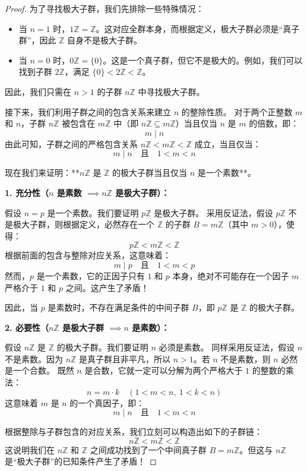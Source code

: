 \documentclass[]{article}
\begin{document}
\begin{proof}
为了寻找极大子群，我们先排除一些特殊情况：
\begin{itemize}
	\item 当 $n = 1$ 时，$1\mathbb{Z} = \mathbb{Z}$。这对应全群本身，而根据定义，极大子群必须是“真子群”，因此 $\mathbb{Z}$ 自身不是极大子群。
	\item 当 $n = 0$ 时，$0\mathbb{Z} = \{0\}$。这是一个真子群，但它不是极大的。例如，我们可以找到子群 $2\mathbb{Z}$，满足 $\{0\} < 2\mathbb{Z} < \mathbb{Z}$。
\end{itemize}
因此，我们只需在 $n > 1$ 的子群 $n\mathbb{Z}$ 中寻找极大子群。

\bigskip
接下来，我们利用子群之间的包含关系来建立 $n$ 的整除性质。
对于两个正整数 $m$ 和 $n$，子群 $n\mathbb{Z}$ 被包含在 $m\mathbb{Z}$ 中（即 $n\mathbb{Z} \subseteq m\mathbb{Z}$）当且仅当 $n$ 是 $m$ 的倍数，即：
\[ m \mid n \]
由此可知，子群之间的严格包含关系 $n\mathbb{Z} < m\mathbb{Z} < \mathbb{Z}$ 成立，当且仅当：
\[ m \mid n \quad \text{且} \quad 1 < m < n \]

现在我们来证明：**$n\mathbb{Z}$ 是 $\mathbb{Z}$ 的极大子群当且仅当 $n$ 是一个素数**。

\bigskip
\noindent \textbf{1. 充分性（$n$ 是素数 $\implies n\mathbb{Z}$ 是极大子群）：}

假设 $n = p$ 是一个素数。我们要证明 $p\mathbb{Z}$ 是极大子群。
采用反证法，假设 $p\mathbb{Z}$ 不是极大子群，则根据定义，必然存在一个 $\mathbb{Z}$ 的子群 $B = m\mathbb{Z}$（其中 $m > 0$），使得：
\[ p\mathbb{Z} < m\mathbb{Z} < \mathbb{Z} \]
根据前面的包含与整除对应关系，这意味着：
\[ m \mid p \quad \text{且} \quad 1 < m < p \]
然而，$p$ 是一个素数，它的正因子只有 $1$ 和 $p$ 本身，绝对不可能存在一个因子 $m$ 严格介于 $1$ 和 $p$ 之间。这产生了矛盾！

因此，当 $p$ 是素数时，不存在满足条件的中间子群 $B$，即 $p\mathbb{Z}$ 是 $\mathbb{Z}$ 的极大子群。

\bigskip
\noindent \textbf{2. 必要性（$n\mathbb{Z}$ 是极大子群 $\implies n$ 是素数）：}

假设 $n\mathbb{Z}$ 是 $\mathbb{Z}$ 的极大子群。我们要证明 $n$ 必须是素数。
同样采用反证法，假设 $n$ 不是素数。因为 $n\mathbb{Z}$ 是真子群且非平凡，所以 $n > 1$。若 $n$ 不是素数，则 $n$ 必然是一个合数。
既然 $n$ 是合数，它就一定可以分解为两个严格大于 $1$ 的整数的乘法：
\[ n = m \cdot k \quad (1 < m < n, \ 1 < k < n) \]
这意味着 $m$ 是 $n$ 的一个真因子，即：
\[ m \mid n \quad \text{且} \quad 1 < m < n \]

根据整除与子群包含的对应关系，我们立刻可以构造出如下的子群链：
\[ n\mathbb{Z} < m\mathbb{Z} < \mathbb{Z} \]
这说明我们在 $n\mathbb{Z}$ 和 $\mathbb{Z}$ 之间成功找到了一个中间真子群 $B = m\mathbb{Z}$。但这与 $n\mathbb{Z}$ 是“极大子群”的已知条件产生了矛盾！


\end{proof}
\end{document}
